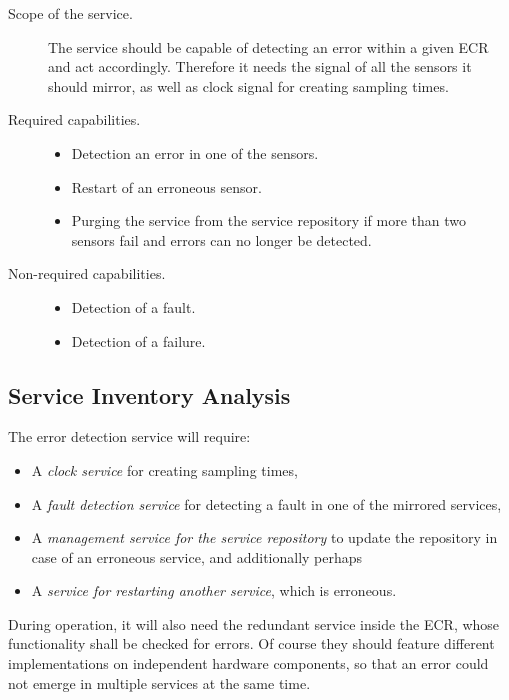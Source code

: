\begin{description}
\item [Scope of the service.]
The service should be capable of detecting an error within a given ECR and act accordingly. Therefore it needs the signal of all the sensors it should mirror, as well as clock signal for creating sampling times.
\item [Required capabilities.]
	\begin{itemize}
	\item Detection an error in one of the sensors.
	\item Restart of an erroneous sensor.
	\item Purging the service from the service repository if more than two sensors fail and errors can no longer be detected.
	\end{itemize}
\item [Non-required capabilities.]
	\begin{itemize}
	\item Detection of a fault.
	\item Detection of a failure.
	\end{itemize}
\end{description}



\subsection{Service Inventory Analysis}


The error detection service will require:
\begin{itemize}
\item A \emph{clock service} for creating sampling times,
\item A \emph{fault detection service} for detecting a fault in one of the mirrored services,
\item A \emph{management service for the service repository} to update the repository in case of an erroneous service, and additionally perhaps
\item A \emph{service for restarting another service}, which is erroneous.
\end{itemize}

During operation, it will also need the redundant service inside the ECR, whose functionality shall be checked for errors. Of course they should feature different implementations on independent hardware components, so that an error could not emerge in multiple services at the same time.


